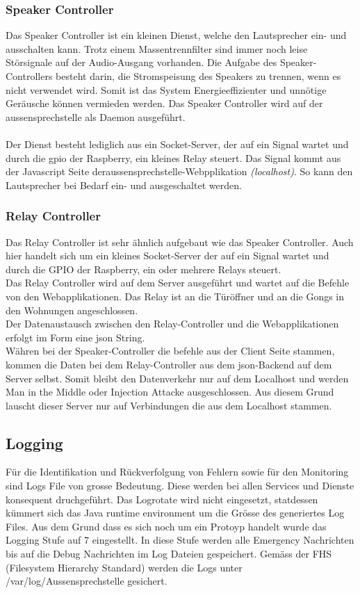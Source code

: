 \subsubsection{Speaker Controller}
Das Speaker Controller ist ein kleinen Dienst, welche den Lautsprecher ein- und ausschalten kann. Trotz einem Massentrennfilter sind immer noch leise Störsignale auf der Audio-Ausgang vorhanden.
Die Aufgabe des Speaker-Controllers besteht darin, die Stromspeisung des Speakers zu trennen, wenn es nicht verwendet wird. Somit ist das System Energieeffizienter und unnötige Geräusche können vermieden werden. Das Speaker Controller wird auf der \gls{aussensprechstelle} als Daemon ausgeführt.
\\
\\
Der Dienst besteht lediglich aus ein Socket-Server, der auf ein Signal wartet und durch die \gls{gpio} der Raspberry, ein kleines Relay steuert.
Das Signal kommt aus der Javascript Seite der\gls{aussensprechstelle}-Webpplikation \textit{(localhost)}. So kann den Lautsprecher bei Bedarf ein- und ausgeschaltet werden.

\subsubsection{Relay Controller}
Das Relay Controller ist sehr ähnlich aufgebaut wie das Speaker Controller. Auch hier handelt sich um ein kleines Socket-Server der auf ein Signal wartet und durch die GPIO der Raspberry, ein oder mehrere Relays steuert.
\\
Das Relay Controller wird auf dem Server ausgeführt und wartet auf die Befehle von den Webapplikationen. Das Relay ist an die Türöffner und an die Gongs in den Wohnungen angeschlossen.
\\
Der Datenaustausch zwischen den Relay-Controller und die Webapplikationen erfolgt im Form eine \gls{json} String.
\\
Währen bei der Speaker-Controller die befehle aus der Client Seite stammen, kommen die Daten bei dem Relay-Controller aus dem \gls{json}-Backend auf dem Server selbst. Somit bleibt den Datenverkehr nur auf dem Localhost und werden Man in the Middle oder Injection Attacke ausgeschlossen. Aus diesem Grund lauscht dieser Server nur auf Verbindungen die aus dem Localhost stammen.

\subsection{Logging}
\label{kap:logs}
Für die Identifikation und Rückverfolgung von Fehlern sowie für den Monitoring sind Logs File von grosse Bedeutung. Diese werden bei allen Services und Dienste konsequent druchgeführt. Das Logrotate wird nicht eingesetzt, statdessen kümmert sich das Java runtime environment um die Grösse des generiertes Log Files. Aus dem Grund dass es sich noch um ein Protoyp handelt wurde das Logging Stufe auf 7 eingestellt. In diese Stufe werden alle Emergency Nachrichten bis auf die Debug Nachrichten im Log Dateien gespeichert.
Gemäss der FHS (Filesystem Hierarchy Standard) werden die Logs unter /var/log/Aussensprechstelle gesichert. 


